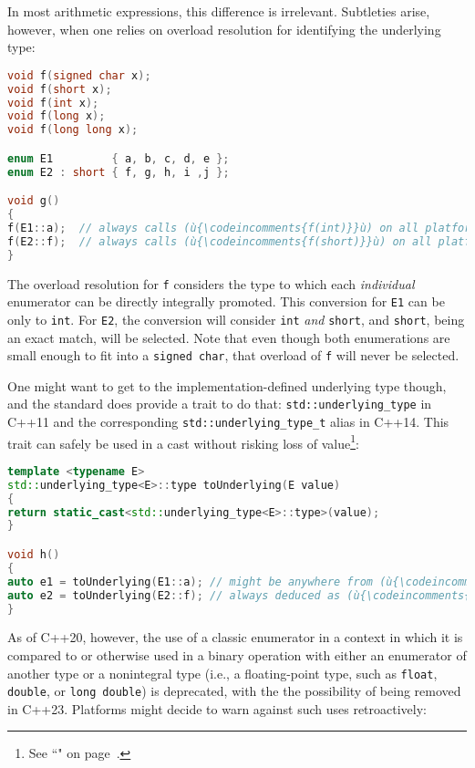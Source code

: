 In most arithmetic expressions, this difference is irrelevant.
Subtleties arise, however, when one relies on overload resolution for
identifying the underlying type:

\begin{lstlisting}[language=C++]
void f(signed char x);
void f(short x);
void f(int x);
void f(long x);
void f(long long x);

enum E1         { a, b, c, d, e };
enum E2 : short { f, g, h, i ,j };

void g()
{
f(E1::a);  // always calls (ù{\codeincomments{f(int)}}ù) on all platforms
f(E2::f);  // always calls (ù{\codeincomments{f(short)}}ù) on all platforms
}
\end{lstlisting}

\noindent The overload resolution for \texttt{f} considers the type to which each
\emph{individual} enumerator can be directly integrally promoted. This
conversion for \texttt{E1} can be only to \texttt{int}. For \texttt{E2},
the conversion will consider \texttt{int} \emph{and} \texttt{short}, and
\texttt{short}, being an exact match, will be selected. Note that even
though both enumerations are small enough to fit into a
\texttt{signed}~\texttt{char}, that overload of \texttt{f} will never be
selected.

One might want to get to the implementation-defined underlying type
though, and the standard does provide a trait to do that:
\texttt{std::underlying\_type} in C++11 and the corresponding
\texttt{std::underlying\_type\_t} alias in C++14. This trait can safely
be used in a cast without risking loss of value{\cprotect\footnote{See
``" on page~\pageref{auto}.}}:

\begin{lstlisting}[language=C++]
template <typename E>
std::underlying_type<E>::type toUnderlying(E value)
{
return static_cast<std::underlying_type<E>::type>(value);
}

void h()
{
auto e1 = toUnderlying(E1::a); // might be anywhere from (ù{\codeincomments{signed char}}ù) to (ù{\codeincomments{int}}ù)
auto e2 = toUnderlying(E2::f); // always deduced as (ù{\codeincomments{short}}ù)
}
\end{lstlisting}

\noindent As of C++20, however, the use of a classic enumerator in a context in
which it is compared to or otherwise used in a binary operation with
either an enumerator of another type or a nonintegral type (i.e., a
floating-point type, such as \texttt{float}, \texttt{double}, or
\texttt{long}~\texttt{double}) is deprecated, with the the possibility
of being removed in C++23. Platforms might decide to warn against such
uses retroactively:

